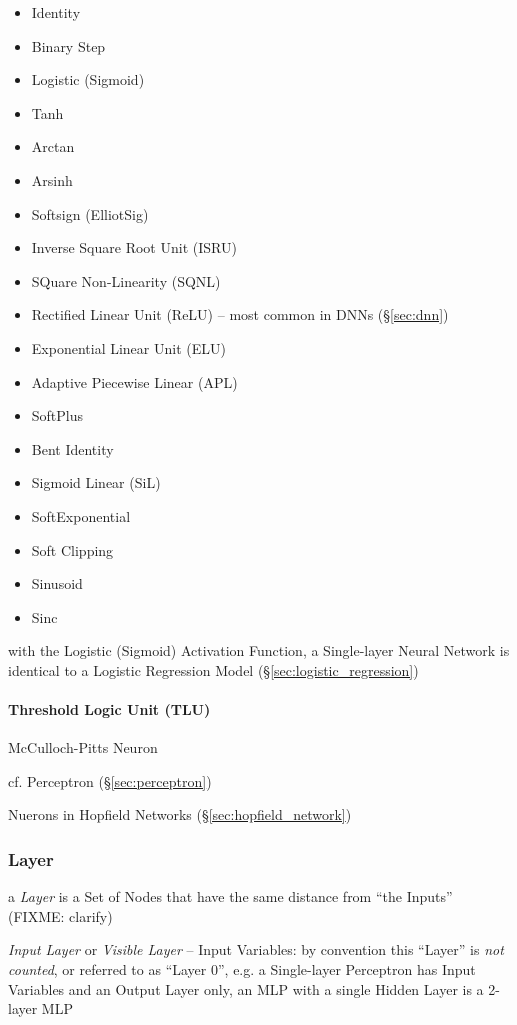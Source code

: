 \begin{itemize}
  \item Identity
  \item Binary Step
  \item Logistic (Sigmoid)
  \item Tanh
  \item Arctan
  \item Arsinh
  \item Softsign (ElliotSig)
  \item Inverse Square Root Unit (ISRU)
  \item SQuare Non-Linearity (SQNL)
  \item Rectified Linear Unit (ReLU) -- most common in DNNs (\S\ref{sec:dnn})
  \item Exponential Linear Unit (ELU)
  \item Adaptive Piecewise Linear (APL)
  \item SoftPlus
  \item Bent Identity
  \item Sigmoid Linear (SiL)
  \item SoftExponential
  \item Soft Clipping
  \item Sinusoid
  \item Sinc
\end{itemize}

with the Logistic (Sigmoid) Activation Function, a Single-layer Neural Network
is identical to a Logistic Regression Model (\S\ref{sec:logistic_regression})



\paragraph{Threshold Logic Unit (TLU)}\label{sec:tlu}\hfill

McCulloch-Pitts Neuron

cf. Perceptron (\S\ref{sec:perceptron})

Nuerons in Hopfield Networks (\S\ref{sec:hopfield_network})



\subsubsection{Layer}\label{sec:ann_layer}

a \emph{Layer} is a Set of Nodes that have the same distance from ``the Inputs''
(FIXME: clarify)

\emph{Input Layer} or \emph{Visible Layer} -- Input Variables: by convention
this ``Layer'' is \emph{not counted}, or referred to as ``Layer $0$'', e.g. a
Single-layer Perceptron has Input Variables and an Output Layer only, an MLP
with a single Hidden Layer is a 2-layer MLP


